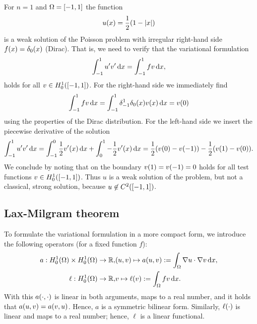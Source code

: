 \begin{example}
	For \(n = 1\) and \(\Omega = \brackets*{-1, 1}\) the function
	\[
		u\parentheses*{x} = \frac{1}{2}\parentheses*{1 - \absolute*{x}}
	\]
	is a weak solution of the Poisson problem with irregular right-hand side \(f\parentheses*{x} = \delta_0\parentheses*{x}\) (Dirac).
	That is, we need to verify that the variational formulation
	\[
		\int_{-1}^1 u'v'\d x = \int_{-1}^1 fv\d x,
	\]
	holds for all \(v \in H_0^1\parentheses*{\brackets*{-1, 1}}\).
	For the right-hand side we immediately find
	\[
		\int_{-1}^1 fv\d x = \int_{-1}^1 \delta_{-1}^1 \delta_0\parentheses*{x}v\parentheses*{x}\d x = v\parentheses*{0}
	\]
	using the properties of the Dirac distribution.
	For the left-hand side we insert the piecewise derivative of the solution
	\[
		\int_{-1}^1 u'v'\d x = \int_{-1}^0 \frac{1}{2}v'\parentheses*{x}\d x + \int_0^1 -\frac{1}{2}v'\parentheses*{x}\d x = \frac{1}{2}\parentheses*{v\parentheses*{0} - v\parentheses*{-1}} - \frac{1}{2}\parentheses*{v\parentheses*{1} - v\parentheses*{0}}.
	\]
	We conclude by noting that on the boundary \(v\parentheses*{1} = v\parentheses*{-1} = 0\) holds for all test functions \(v \in H_0^1\parentheses*{\brackets*{-1, 1}}\).
	Thus \(u\) is a weak solution of the problem, but not a classical, strong solution, because \(u \not\in C^2\parentheses*{\brackets*{-1, 1}}\).
\end{example}


\subsection{Lax-Milgram theorem}

To formulate the variational formulation in a more compact form, we introduce the following operators (for a fixed function \(f\)):
\begin{align*}
	a: H_0^1\parentheses*{\Omega} \times H_0^1\parentheses*{\Omega} \to \R, &\parentheses*{u, v} \mapsto a\parentheses*{u, v} := \int_\Omega \nabla u \cdot \nabla v\d x,\\
	\ell: H_0^1\parentheses*{\Omega} \to \R, &v \mapsto \ell\parentheses*{v} := \int_\Omega fv\d x.
\end{align*}
With this \(a\parentheses*{\cdot, \cdot}\) is linear in both arguments, maps to a real number, and it holds that \(a\parentheses*{u, v} = a\parentheses*{v, u}\).
Hence, \(a\) is a symmetric bilinear form.
Similarly, \(\ell\parentheses*{\cdot}\) is linear and maps to a real number; hence, \(\ell\) is a linear functional.

